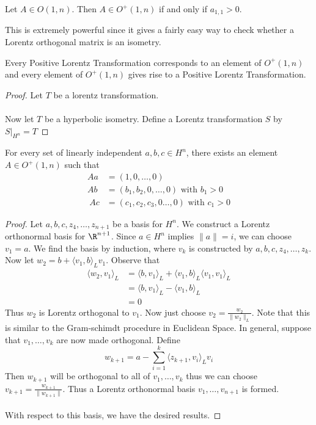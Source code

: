 \begin{lmm}{}{} Let $A\in O(1,n)$. Then $A\in O^+(1,n)$ if and only if $a_{1,1}>0$. 
\end{lmm}

This is extremely powerful since it gives a fairly easy way to check whether a Lorentz orthogonal matrix is an isometry. 

\begin{crl}{}{} Every Positive Lorentz Transformation corresponds to an element of $O^+(1,n)$ and every element of $O^+(1,n)$ gives rise to a Positive Lorentz Transformation. \tcbline
\begin{proof}
Let $T$ be a lorentz transformation. \\~\\
Now let $T$ be a hyperbolic isometry. Define a Lorentz transformation $S$ by $S|_{H^n}=T$
\end{proof}
\end{crl}

\begin{lmm}{}{} For every set of linearly independent $a,b,c\in H^n$, there exists an element $A\in O^+(1,n)$ such that 
\begin{align*}
Aa&=(1,0,\dots,0)\\
Ab&=(b_1,b_2,0,\dots,0)\text{ with }b_1>0\\\
Ac&=(c_1,c_2,c_3,0\dots,0)\text{ with }c_1>0
\end{align*} \tcbline
\begin{proof}
Let $a,b,c,z_4,\dots,z_{n+1}$ be a basis for $H^n$. We construct a Lorentz orthonormal basis for $\R^{n+1}$. Since $a\in H^n$ implies $\|a\|=i$, we can choose $v_1=a$. We find the basis by induction, where $v_k$ is constructed by $a,b,c,z_4,\dots,z_k$. Now let $w_2=b+\langle v_1,b\rangle_L v_1$. Observe that 
\begin{align*}
\langle w_2,v_1\rangle_L&=\langle b,v_1\rangle_L+\langle v_1,b\rangle_L\langle v_1,v_1\rangle_L\\
&=\langle b,v_1\rangle_L-\langle v_1,b\rangle_L\tag{$\langle v_1,v_1\rangle_L=-1$}\\
&=0
\end{align*}
Thus $w_2$ is Lorentz orthogonal to $v_1$. Now just choose $v_2=\frac{w_2}{\|w_2\|_L}$. Note that this is similar to the Gram-schimdt procedure in Euclidean Space. In general, suppose that $v_1,\dots,v_k$ are now made orthogonal. Define $$w_{k+1}=a-\sum_{i=1}^k\langle z_{k+1},v_i\rangle_Lv_i$$ Then $w_{k+1}$ will be orthogonal to all of $v_1,\dots,v_k$ thus we can choose $v_{k+1}=\frac{w_{k+1}}{\|w_{k+1}\|}$. Thus a Lorentz orthonormal basis $v_1,\dots,v_{n+1}$ is formed. \\~\\
With respect to this basis, we have the desired results. 
\end{proof}
\end{lmm}

